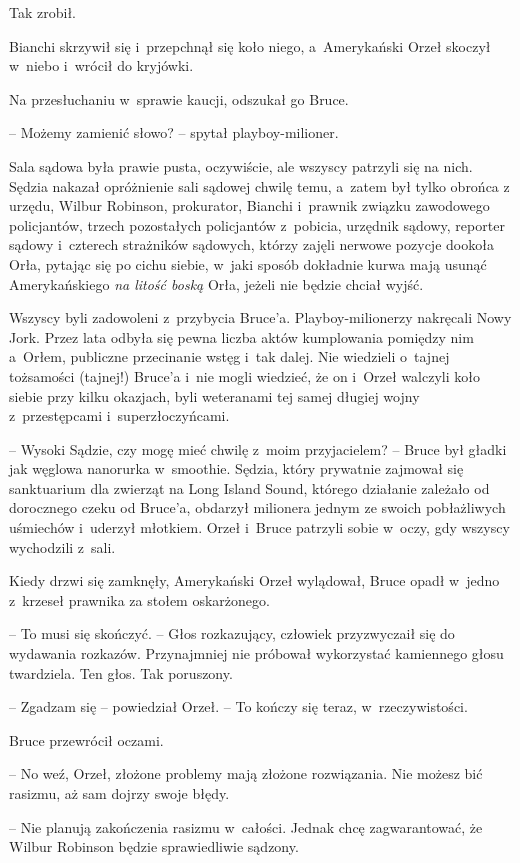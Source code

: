 \documentclass[oneside,polish,11pt,sfheadings]{mwbk}
\begin{document}
Tak zrobił.

Bianchi skrzywił się i~przepchnął się koło niego, a~Amerykański Orzeł
skoczył w~niebo i~wrócił do kryjówki.

Na przesłuchaniu w~sprawie kaucji, odszukał go Bruce.

-- Możemy zamienić słowo? -- spytał playboy-milioner. 

Sala sądowa była
prawie pusta, oczywiście, ale wszyscy patrzyli się na nich. Sędzia
nakazał opróżnienie sali sądowej chwilę temu, a~zatem był tylko obrońca
z urzędu, Wilbur Robinson, prokurator, Bianchi i~prawnik związku
zawodowego policjantów, trzech pozostałych policjantów z~pobicia,
urzędnik sądowy, reporter sądowy i~czterech strażników sądowych, którzy
zajęli nerwowe pozycje dookoła Orła, pytając się po cichu siebie, w~jaki
sposób dokładnie kurwa mają usunąć Amerykańskiego \textit{na litość boską}
Orła, jeżeli nie będzie chciał wyjść.

Wszyscy byli zadowoleni z~przybycia Bruce'a. Playboy-milionerzy
nakręcali Nowy Jork. Przez lata odbyła się pewna liczba aktów
kumplowania pomiędzy nim a~Orłem, publiczne przecinanie wstęg i~tak
dalej. Nie wiedzieli o~tajnej tożsamości (tajnej!) Bruce'a i~nie mogli
wiedzieć, że on i~Orzeł walczyli koło siebie przy kilku okazjach, byli
weteranami tej samej długiej wojny z~przestępcami i~superzłoczyńcami.

-- Wysoki Sądzie, czy mogę mieć chwilę z~moim przyjacielem? -- Bruce był
gładki jak węglowa nanorurka w~smoothie. Sędzia, który prywatnie
zajmował się sanktuarium dla zwierząt na Long Island Sound, którego
działanie zależało od dorocznego czeku od Bruce'a, obdarzył milionera
jednym ze swoich pobłażliwych uśmiechów i~uderzył młotkiem. Orzeł i~Bruce patrzyli sobie w~oczy, gdy wszyscy wychodzili z~sali.

Kiedy drzwi się zamknęły, Amerykański Orzeł wylądował, Bruce opadł w~jedno z~krzeseł prawnika za stołem oskarżonego.

-- To musi się skończyć. -- Głos rozkazujący, człowiek przyzwyczaił się do
wydawania rozkazów. Przynajmniej nie próbował wykorzystać kamiennego
głosu twardziela. Ten głos. Tak poruszony.

-- Zgadzam się -- powiedział Orzeł. -- To kończy się teraz, w~rzeczywistości.

Bruce przewrócił oczami. 

-- No weź, Orzeł, złożone problemy mają złożone
rozwiązania. Nie możesz bić rasizmu, aż sam dojrzy swoje błędy.

-- Nie planują zakończenia rasizmu w~całości. Jednak chcę zagwarantować,
że Wilbur Robinson będzie sprawiedliwie sądzony.
\end{document}
